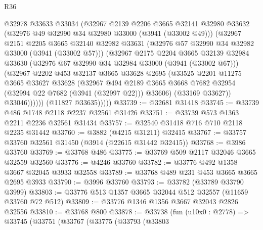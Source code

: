 \begin{lexlean}{R36}
\begin{coremodule}
                @32978
                @33633
                @33034
                (@32967
                  @2139
                  @2206
                  @3665
                  @32141
                  @32980
                  @33632
                  (@32976 @49 @32990 @34 @32980 @33000 (@3941 (@33002 @49)))
                  (@32967
                    @2151
                    @2205
                    @3665
                    @32140
                    @32982
                    @33631
                    (@32976 @57 @32990 @34 @32982 @33000 (@3941 (@33002 @57)))
                    (@32967
                      @2175
                      @2204
                      @3665
                      @32139
                      @32984
                      @33630
                      (@32976 @67 @32990 @34 @32984 @33000 (@3941 (@33002 @67)))
                      (@32967
                        @2202
                        @453
                        @32137
                        @3665
                        @33628
                        @2695
                        (@33525
                          @2201
                          @11275
                          @3665
                          @33627
                          @33628
                          (@32967
                            @494
                            @2189
                            @3665
                            @3668
                            @7682
                            @32954
                            (@32994 @22 @7682 (@3941 (@32997 @22)))
                            @33606)
                          (@33169 @33627))
                        @33046))))))
            (@11827 @33635)))))
@33739 := @32681 @31418
@33745 := @33739 @486 @1748 @2118 @2237 @32561 @31426
@33751 := @33739 @573 @1363 @2211 @2236 @32561 @31434
@33757 := @32540 @31418 @716 @710 @2118 @2235 @31442
@33760 := @3882 (@4215 @31211) @32415
@33767 := @33757 @33760 @32561 @31450 (@3914 (@22615 @31442 @32415))
@33768 := @3986 @33760
@33769 := @33768 @486
@33775 := @33769 @509 @2117 @32046 @3665 @32559 @32560
@33776 := @4246 @33760
@33782 := @33776 @492 @1358 @3667 @32045 @3933 @32558
@33789 := @33768 @489 @231 @453 @3665 @3665 @2695 @3933
@33790 := @3996 @33760
@33793 := @33782 (@33789 @33790 @3999)
@33803 := @33776 @513 @1357 @3665 @32044 @512 @32557 (@11659 @33760 @72 @512)
@33809 := @33776 @1346 @1356 @3667 @32043 @2826 @32556
@33810 := @33768 @800
@33878 := @33738
    (fun (u10x0 : @2778) =>
    @33745
      (@33751
        (@33767
          (@33775
            (@33793
              (@33803

\end{coremodule}
\end{lexlean}
